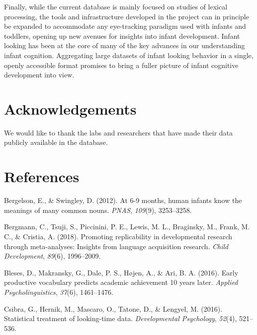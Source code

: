 \documentclass[10pt, letterpaper]{article}
\begin{document}
Finally, while the current database is mainly focused on studies of
lexical processing, the tools and infrastructure developed in the
project can in principle be expanded to accommodate any eye-tracking
paradigm used with infants and toddlers, opening up new avenues for
insights into infant development. Infant looking has been at the core of
many of the key advances in our understanding infant cognition.
Aggregating large datasets of infant looking behavior in a single,
openly accessible format promises to bring a fuller picture of infant
cognitive development into view.

\hypertarget{acknowledgements}{%
\section{Acknowledgements}\label{acknowledgements}}

We would like to thank the labs and researchers that have made their
data publicly available in the database.

\hypertarget{references}{%
\section{References}\label{references}}

\setlength{\parindent}{-0.1in} 
\setlength{\leftskip}{0.125in}

\noindent

\hypertarget{refs}{}
\leavevmode\hypertarget{ref-Bergelson2012a}{}%
Bergelson, E., \& Swingley, D. (2012). At 6-9 months, human infants know
the meanings of many common nouns. \emph{PNAS}, \emph{109}(9),
3253--3258.

\leavevmode\hypertarget{ref-Bergmann2018}{}%
Bergmann, C., Tsuji, S., Piccinini, P. E., Lewis, M. L., Braginsky, M.,
Frank, M. C., \& Cristia, A. (2018). Promoting replicability in
developmental research through meta-analyses: Insights from language
acquisition research. \emph{Child Development}, \emph{89}(6),
1996--2009.

\leavevmode\hypertarget{ref-Bleses2016}{}%
Bleses, D., Makransky, G., Dale, P. S., Højen, A., \& Ari, B. A. (2016).
Early productive vocabulary predicts academic achievement 10 years
later. \emph{Applied Psycholinguistics}, \emph{37}(6), 1461--1476.

\leavevmode\hypertarget{ref-Csibra2016}{}%
Csibra, G., Hernik, M., Mascaro, O., Tatone, D., \& Lengyel, M. (2016).
Statistical treatment of looking-time data. \emph{Developmental
Psychology}, \emph{52}(4), 521--536.
\end{document}
